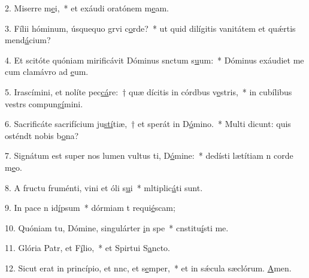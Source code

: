 2. Miserre m\uline{e}i,~* et exáudi oratónem m\uline{e}am.\par 
3. Fílii hóminum, úsquequo grvi c\uline{o}rde?~* ut quid dilígitis vanitátem et quǽrtis mend\uline{á}cium?\par 
4. Et scitóte quóniam mirificávit Dóminus snctum s\uline{u}um:~* Dóminus exáudiet me cum clamávro ad \uline{e}um.\par 
5. Irascímini, et nolíte pec\uline{cá}re:~† quæ dícitis in córdbus v\uline{e}stris,~* in cubílibus vestrs compung\uline{í}mini.\par 
6. Sacrificáte sacrifícium ju\uline{stí}tiæ,~† et sperát in D\uline{ó}mino.~* Multi dicunt: quis osténdt nobis b\uline{o}na?\par 
7. Signátum est super nos lumen vultus ti, D\uline{ó}mine:~* dedísti lætítiam n corde m\uline{e}o.\par 
8. A fructu fruménti, vini et óli s\uline{u}i~* mltiplic\uline{á}ti sunt.\par 
9. In pace n id\uline{í}psum~* dórmiam t requi\uline{é}scam;\par 
10. Quóniam tu, Dómine, singulárter \uline{i}n spe~* cnstitu\uline{í}sti me.\par 
11. Glória Patr, et F\uline{í}lio,~* et Spirtui S\uline{a}ncto.\par 
12. Sicut erat in princípio, et nnc, et s\uline{e}mper,~* et in sǽcula sæclórum. \uline{A}men.\par 
